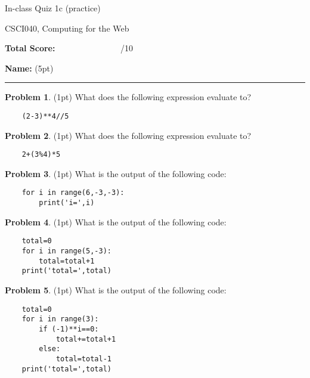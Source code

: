 \documentclass[10pt]{article}
\theoremstyle{definition}
\newtheorem{problem}{Problem}
\begin{document}
\begin{center}
    {
\Large
In-class Quiz 1c (practice)
}

    \vspace{0.1in}
CSCI040, Computing for the Web

    \vspace{0.1in}
\end{center}

\vspace{0.25in}
\noindent
\textbf{Total Score:} ~~~~~~~~~~~~~~~/10

\vspace{0.5in}
\noindent
\textbf{Name:} (5pt)

\noindent
\rule{\textwidth}{0.1pt}
\vspace{0.25in}

\begin{problem}
    (1pt)
    What does the following expression evaluate to?
\end{problem}
\begin{lstlisting}
    (2-3)**4//5
\end{lstlisting}
\vspace{1.5in}

\begin{problem}
    (1pt)
    What does the following expression evaluate to?
\end{problem}
\begin{lstlisting}
    2+(3%4)*5
\end{lstlisting}
\vspace{1.5in}

\begin{problem}
    (1pt)
    What is the output of the following code:
\end{problem}
\begin{lstlisting}
    for i in range(6,-3,-3):
        print('i=',i)
\end{lstlisting}
\vspace{2in}

\begin{problem}
    (1pt)
    What is the output of the following code:
\end{problem}
\begin{lstlisting}
    total=0
    for i in range(5,-3):
        total=total+1
    print('total=',total)
\end{lstlisting}
\vspace{2in}

\begin{problem}
    (1pt)
    What is the output of the following code:
\end{problem}
\begin{lstlisting}
    total=0
    for i in range(3):
        if (-1)**i==0:
            total+=total+1
        else:
            total=total-1
    print('total=',total)
\end{lstlisting}
\end{document}

